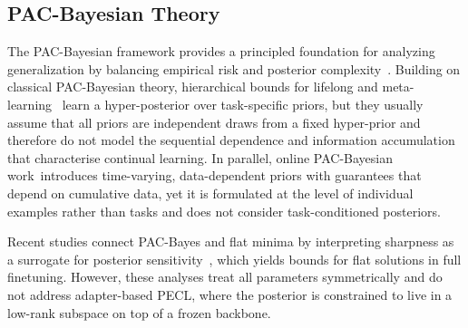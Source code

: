 \documentclass{article}
\theoremstyle{plain}
\theoremstyle{definition}
\theoremstyle{remark}
\begin{document}
\subsection{PAC-Bayesian Theory }


The PAC-Bayesian framework provides a principled foundation for analyzing generalization by balancing empirical risk and posterior complexity~\cite{mcallesterPACBayesianStochasticModel2003,pentinaPACBayesianBoundLifelong2014,germainPACBayesianTheoryMeets2016,lotfiPACBayesCompressionBounds2022}.
Building on classical PAC-Bayesian theory, hierarchical bounds for lifelong and meta-learning~\citep{pentinaPACBayesianBoundLifelong2014,JMLR:v24:22-1254} learn a hyper-posterior over task-specific priors, but they usually assume that all priors are independent draws from a fixed hyper-prior and therefore do not model the sequential dependence and information accumulation that characterise continual learning. In parallel, online PAC-Bayesian work~\citep{NEURIPS2022_onlineBayes,NEURIPS2024_xinrui}introduces time-varying, data-dependent priors with guarantees that depend on cumulative data, yet it is formulated at the level of individual examples rather than tasks and does not consider task-conditioned posteriors.


Recent studies connect PAC-Bayes and flat minima by interpreting sharpness as a surrogate for posterior sensitivity~\citep{NIPS2017_10ce03a1,jiang2019fantasticgeneralizationmeasures,mllenhoff2023sam}, which yields bounds for flat solutions in full finetuning. However, these analyses treat all parameters symmetrically and do not address adapter-based PECL, where the posterior is constrained to live in a low-rank subspace on top of a frozen backbone.
\end{document}
